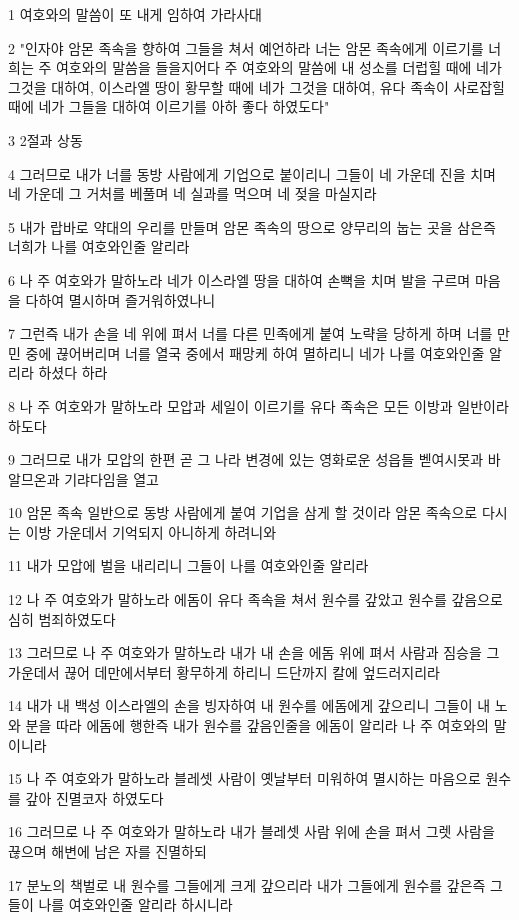 \par 1 여호와의 말씀이 또 내게 임하여 가라사대
\par 2 "인자야 암몬 족속을 향하여 그들을 쳐서 예언하라 너는 암몬 족속에게 이르기를 너희는 주 여호와의 말씀을 들을지어다 주 여호와의 말씀에 내 성소를 더럽힐 때에 네가 그것을 대하여, 이스라엘 땅이 황무할 때에 네가 그것을 대하여, 유다 족속이 사로잡힐 때에 네가 그들을 대하여 이르기를 아하 좋다 하였도다"
\par 3 2절과 상동
\par 4 그러므로 내가 너를 동방 사람에게 기업으로 붙이리니 그들이 네 가운데 진을 치며 네 가운데 그 거처를 베풀며 네 실과를 먹으며 네 젖을 마실지라
\par 5 내가 랍바로 약대의 우리를 만들며 암몬 족속의 땅으로 양무리의 눕는 곳을 삼은즉 너희가 나를 여호와인줄 알리라
\par 6 나 주 여호와가 말하노라 네가 이스라엘 땅을 대하여 손뼉을 치며 발을 구르며 마음을 다하여 멸시하며 즐거워하였나니
\par 7 그런즉 내가 손을 네 위에 펴서 너를 다른 민족에게 붙여 노략을 당하게 하며 너를 만민 중에 끊어버리며 너를 열국 중에서 패망케 하여 멸하리니 네가 나를 여호와인줄 알리라 하셨다 하라
\par 8 나 주 여호와가 말하노라 모압과 세일이 이르기를 유다 족속은 모든 이방과 일반이라 하도다
\par 9 그러므로 내가 모압의 한편 곧 그 나라 변경에 있는 영화로운 성읍들 벧여시못과 바알므온과 기랴다임을 열고
\par 10 암몬 족속 일반으로 동방 사람에게 붙여 기업을 삼게 할 것이라 암몬 족속으로 다시는 이방 가운데서 기억되지 아니하게 하려니와
\par 11 내가 모압에 벌을 내리리니 그들이 나를 여호와인줄 알리라
\par 12 나 주 여호와가 말하노라 에돔이 유다 족속을 쳐서 원수를 갚았고 원수를 갚음으로 심히 범죄하였도다
\par 13 그러므로 나 주 여호와가 말하노라 내가 내 손을 에돔 위에 펴서 사람과 짐승을 그 가운데서 끊어 데만에서부터 황무하게 하리니 드단까지 칼에 엎드러지리라
\par 14 내가 내 백성 이스라엘의 손을 빙자하여 내 원수를 에돔에게 갚으리니 그들이 내 노와 분을 따라 에돔에 행한즉 내가 원수를 갚음인줄을 에돔이 알리라 나 주 여호와의 말이니라
\par 15 나 주 여호와가 말하노라 블레셋 사람이 옛날부터 미워하여 멸시하는 마음으로 원수를 갚아 진멸코자 하였도다
\par 16 그러므로 나 주 여호와가 말하노라 내가 블레셋 사람 위에 손을 펴서 그렛 사람을 끊으며 해변에 남은 자를 진멸하되
\par 17 분노의 책벌로 내 원수를 그들에게 크게 갚으리라 내가 그들에게 원수를 갚은즉 그들이 나를 여호와인줄 알리라 하시니라

